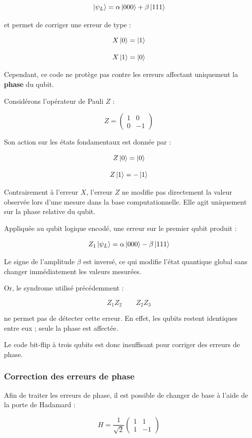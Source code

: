 \documentclass[a4paper,12pt]{article}
\begin{document}
\[
\ket{\psi_L}
=
\alpha\ket{000}
+
\beta\ket{111}
\]

et permet de corriger une erreur de type :

\[
X\ket{0}
=
\ket{1}
\]

\[
X\ket{1}
=
\ket{0}
\]

Cependant, ce code ne protège pas contre les erreurs affectant uniquement la \textbf{phase} du qubit.

Considérons l’opérateur de Pauli $Z$ :

\[
Z=
\begin{pmatrix}
1&0\\
0&-1
\end{pmatrix}
\]

Son action sur les états fondamentaux est donnée par :

\[
Z\ket{0}
=
\ket{0}
\]

\[
Z\ket{1}
=
-\ket{1}
\]

Contrairement à l’erreur $X$, l’erreur $Z$ ne modifie pas directement la valeur observée lors d’une mesure dans la base computationnelle. Elle agit uniquement sur la phase relative du qubit.

Appliquée au qubit logique encodé, une erreur sur le premier qubit produit :

\[
Z_1\ket{\psi_L}
=
\alpha\ket{000}
-
\beta\ket{111}
\]

Le signe de l’amplitude $\beta$ est inversé, ce qui modifie l’état quantique global sans changer immédiatement les valeurs mesurées.

Or, le syndrome utilisé précédemment :

\[
Z_1Z_2
\qquad
Z_2Z_3
\]

ne permet pas de détecter cette erreur. En effet, les qubits restent identiques entre eux ; seule la phase est affectée.

Le code bit-flip à trois qubits est donc insuffisant pour corriger des erreurs de phase.

\subsubsection{Correction des erreurs de phase}

Afin de traiter les erreurs de phase, il est possible de changer de base à l’aide de la porte de Hadamard :

\[
H
=
\frac{1}{\sqrt{2}}
\begin{pmatrix}
1&1\\
1&-1
\end{pmatrix}
\]
\end{document}

